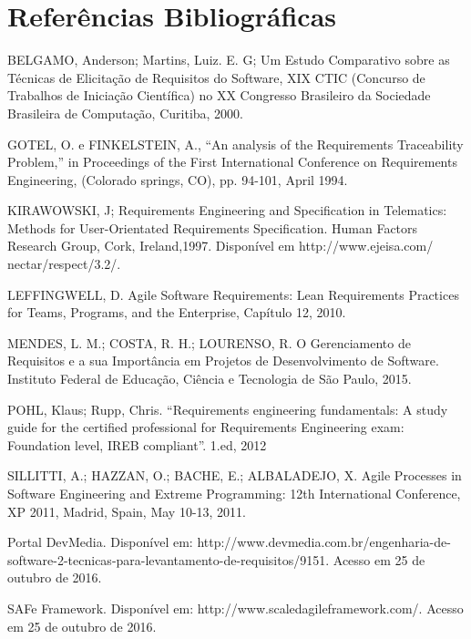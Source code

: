 \chapter[Referências Bibliográficas]{Referências Bibliográficas}

BELGAMO, Anderson; Martins, Luiz. E. G; Um Estudo Comparativo sobre as Técnicas de Elicitação de Requisitos do Software, XIX CTIC (Concurso de Trabalhos de Iniciação Científica) no XX Congresso Brasileiro da Sociedade Brasileira de Computação, Curitiba, 2000.

GOTEL, O. e FINKELSTEIN, A., “An analysis of the Requirements Traceability Problem,” in Proceedings of the First International Conference on Requirements Engineering, (Colorado springs, CO), pp. 94-101, April 1994.

KIRAWOWSKI, J; Requirements Engineering and Specification in Telematics: Methods for User-Orientated Requirements Specification. Human Factors Research Group, Cork, Ireland,1997. Disponível em http://www.ejeisa.com/ nectar/respect/3.2/.

LEFFINGWELL, D. Agile Software Requirements: Lean Requirements Practices for Teams, Programs, and the Enterprise, Capítulo 12, 2010.

MENDES, L. M.; COSTA, R. H.; LOURENSO, R. O Gerenciamento de Requisitos e a sua Importância em Projetos de Desenvolvimento de Software. Instituto Federal de Educação, Ciência e Tecnologia de São Paulo, 2015.

POHL, Klaus; Rupp, Chris. “Requirements engineering fundamentals: A study guide for the certified professional for Requirements Engineering exam: Foundation level, IREB compliant”. 1.ed, 2012

SILLITTI, A.; HAZZAN, O.; BACHE, E.; ALBALADEJO, X. Agile Processes in Software Engineering and Extreme Programming: 12th International Conference, XP 2011, Madrid, Spain, May 10-13, 2011.

Portal DevMedia. Disponível em: http://www.devmedia.com.br/engenharia-de-software-2-tecnicas-para-levantamento-de-requisitos/9151. Acesso em 25 de outubro de 2016.

SAFe Framework. Disponível em: http://www.scaledagileframework.com/. Acesso em 25 de outubro de 2016.

